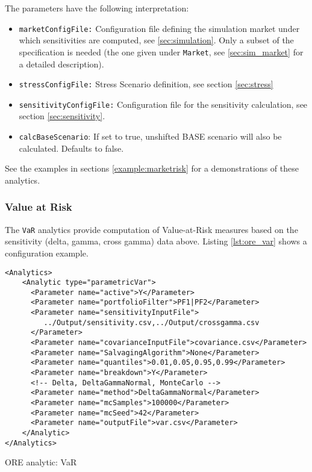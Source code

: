 {The parameters have the following interpretation:

\begin{itemize}
  \item {\tt marketConfigFile:} Configuration file defining the simulation market under which sensitivities are computed,
    see \ref{sec:simulation}. Only a subset of the specification is needed (the one given under {\tt Market}, see
    \ref{sec:sim_market} for a detailed description).
  \item {\tt stressConfigFile:} Stress Scenario definition, see section \ref{sec:stress}
  \item {\tt sensitivityConfigFile:} Configuration file  for the sensitivity calculation, see section \ref{sec:sensitivity}.
  \item {\tt calcBaseScenario}: If set to true, unshifted BASE scenario will also be calculated. Defaults to false.
\end{itemize}

See the examples in sections \ref{example:marketrisk} for a demonstrations of these analytics.

\subsubsection{Value at Risk}

The {\tt VaR} analytics provide computation of Value-at-Risk measures based on the sensitivity (delta, gamma, cross gamma) data above. Listing \ref{lst:ore_var} shows a configuration example.

\begin{listing}[H]
\begin{verbatim}
<Analytics>
    <Analytic type="parametricVar"> 
      <Parameter name="active">Y</Parameter> 
      <Parameter name="portfolioFilter">PF1|PF2</Parameter>
      <Parameter name="sensitivityInputFile">
         ../Output/sensitivity.csv,../Output/crossgamma.csv
      </Parameter> 
      <Parameter name="covarianceInputFile">covariance.csv</Parameter> 
      <Parameter name="SalvagingAlgorithm">None</Parameter>
      <Parameter name="quantiles">0.01,0.05,0.95,0.99</Parameter> 
      <Parameter name="breakdown">Y</Parameter> 
      <!-- Delta, DeltaGammaNormal, MonteCarlo --> 
      <Parameter name="method">DeltaGammaNormal</Parameter> 
      <Parameter name="mcSamples">100000</Parameter> 
      <Parameter name="mcSeed">42</Parameter> 
      <Parameter name="outputFile">var.csv</Parameter> 
    </Analytic> 
</Analytics>
\end{verbatim}
\caption{ORE analytic: VaR}
\label{lst:ore_var}
\end{listing}

}
